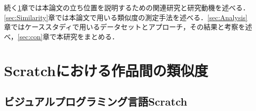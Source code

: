 \documentclass[T,J]{fose} %
\begin{document}
続く\ref{sec:RelatedWork}章では本論文の立ち位置を説明するための関連研究と研究動機を述べる．\ref{sec:Similarity}章では本論文で用いる類似度の測定手法を述べる．\ref{sec:Analysis}章ではケーススタディで用いるデータセットとアプローチ，その結果と考察を述べ，\ref{sec:con}章で本研究をまとめる．

\section{Scratchにおける作品間の類似度}\label{sec:RelatedWork}

\subsection{ビジュアルプログラミング言語Scratch}\label{subsec:Scratch}
\end{document}
